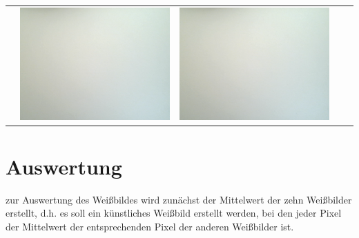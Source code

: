 \begin{tabular}{c c c c c}
 &
\includegraphics[scale=0.11]{media/weissbilder/weissbild_8.png}
 & 
\includegraphics[scale=0.11]{media/weissbilder/weissbild_9.png}
\end{tabular} 

\section{Auswertung}
\label{chap:VERSUCH_3_AUSWERTUNG}

zur Auswertung des Weißbildes wird zunächst der Mittelwert der zehn Weißbilder erstellt, d.h. es soll ein künstliches Weißbild erstellt werden, bei den jeder Pixel der Mittelwert der entsprechenden Pixel der anderen Weißbilder ist.


